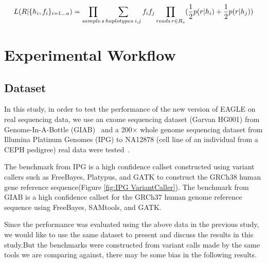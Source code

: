\documentclass[PhD]{PHlab-thesis}
\begin{document}
\begin{equation}
  L(R|\{ {h_i,f_i} \}_{i=1...a}) = \prod_{sample \hspace{0.5mm} s}\sum_{haplotypes \hspace{0.75mm} i,j} {f_if_j} \prod_{reads \hspace{0.5mm} r \in R_s} (\frac{1}{2}p(r|h_i) + \frac{1}{2} p(r|h_j))
\end{equation}

\chapter{Experimental Workflow}
\section{Dataset}
In this study, in order to test the performance of the new version of EAGLE on real sequencing data, we use an exome sequencing dataset (Garvan HG001) from Genome-In-A-Bottle (GIAB)~\cite{Zook2014GIAB} and a 200× whole genome sequencing dataset from Illumina Platinum Genomes (IPG) to NA12878 (cell line of an individual from a CEPH pedigree) real data were tested~\cite{Eberle2021IPG}.

\begin{table}[h!]
	\centering
	\caption{The Dataset of Experiment.}
	\label{table:1}
\end{table}

The benchmark from IPG is a high confidence callset constructed using variant callers such as FreeBayes, Platypus, and GATK to construct the GRCh38 human gene reference sequence(Figure \ref{fig:IPG VariantCaller}).
The benchmark from GIAB is a high confidence callset for the GRCh37 human genome reference sequence using FreeBayes, SAMtools, and GATK.

Since the performance was evaluated using the above data in the previous study, we would like to use the same dataset to present and discuss the results in this study.But the benchmarks were constructed from variant calls made by the same tools we are comparing against, there may be some bias in the following results.
\end{document}
